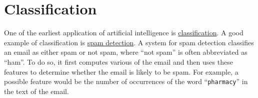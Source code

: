 \chapter{Classification \label{chapter:classification}}
One of the earliest application of artificial intelligence is 
\href{https://en.wikipedia.org/wiki/Statistical_classification}{classification}.  A good
example of classification is \href{https://en.wikipedia.org/wiki/Anti-spam_techniques#Detecting_spam}{spam detection}.
A system for spam detection classifies an email as either spam or not spam, where ``not spam'' is often
abbreviated as ``ham''.  To do so, it first
computes various  of the email and then uses these features to determine whether the email is
likely to be spam.  For example, a possible feature would be the number of occurrences of the word
``\texttt{pharmacy}'' in the text of the email.

